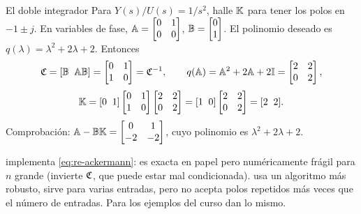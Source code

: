\begin{ejemplo}[label=ej:re-ackermann]{El doble integrador}
Para $Y(s)/U(s)=1/s^2$, halle $\mathbb{K}$ para tener los polos en $-1\pm j$.
\solucion En variables de fase, $\mathbb{A}=\begin{bmatrix}0&1\\0&0\end{bmatrix}$, $\mathbb{B}=\begin{bmatrix}0\\1\end{bmatrix}$. El polinomio deseado es $q(\lambda)=\lambda^2+2\lambda+2$. Entonces
\[
  \mathfrak{C}=[\mathbb{B}\;\;\mathbb{A}\mathbb{B}]=\begin{bmatrix}0&1\\1&0\end{bmatrix}=\mathfrak{C}^{-1},\qquad
  q(\mathbb{A})=\mathbb{A}^2+2\mathbb{A}+2\mathbb{I}=\begin{bmatrix}2&2\\0&2\end{bmatrix},
\]
\[
  \mathbb{K}=[0\;\;1]\begin{bmatrix}0&1\\1&0\end{bmatrix}\begin{bmatrix}2&2\\0&2\end{bmatrix}=[1\;\;0]\begin{bmatrix}2&2\\0&2\end{bmatrix}=[2\;\;2].
\]
Comprobación: $\mathbb{A}-\mathbb{B}\mathbb{K}=\begin{bmatrix}0&1\\-2&-2\end{bmatrix}$, cuyo polinomio es $\lambda^2+2\lambda+2$.
\end{ejemplo}


\begin{cuidado}
 implementa \eqref{eq:re-ackermann}: es exacta en papel pero numéricamente frágil para $n$ grande (invierte $\mathfrak{C}$, que puede estar mal condicionada).  usa un algoritmo más robusto, sirve para varias entradas, pero no acepta polos repetidos más veces que el número de entradas. Para los ejemplos del curso dan lo mismo.
\end{cuidado}


